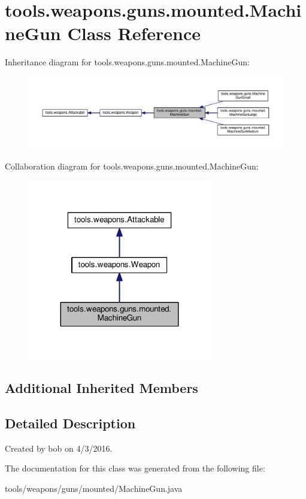 \hypertarget{classtools_1_1weapons_1_1guns_1_1mounted_1_1_machine_gun}{}\section{tools.\+weapons.\+guns.\+mounted.\+Machine\+Gun Class Reference}
\label{classtools_1_1weapons_1_1guns_1_1mounted_1_1_machine_gun}


Inheritance diagram for tools.\+weapons.\+guns.\+mounted.\+Machine\+Gun\+:\nopagebreak
\begin{figure}[H]
\begin{center}
\leavevmode
\includegraphics[width=350pt]{classtools_1_1weapons_1_1guns_1_1mounted_1_1_machine_gun__inherit__graph}
\end{center}
\end{figure}


Collaboration diagram for tools.\+weapons.\+guns.\+mounted.\+Machine\+Gun\+:\nopagebreak
\begin{figure}[H]
\begin{center}
\leavevmode
\includegraphics[width=227pt]{classtools_1_1weapons_1_1guns_1_1mounted_1_1_machine_gun__coll__graph}
\end{center}
\end{figure}
\subsection*{Additional Inherited Members}


\subsection{Detailed Description}
Created by bob on 4/3/2016. 

The documentation for this class was generated from the following file\+:\begin{DoxyCompactItemize}
\item 
tools/weapons/guns/mounted/Machine\+Gun.\+java\end{DoxyCompactItemize}
